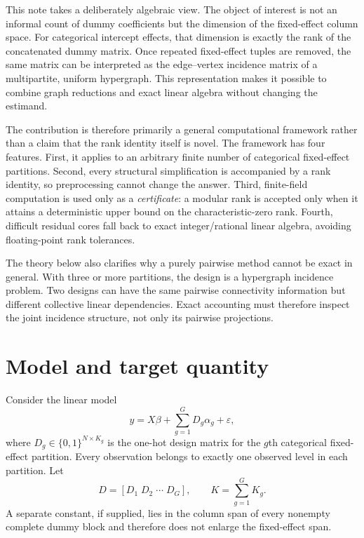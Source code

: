 \documentclass[11pt]{article}
\theoremstyle{definition}
\newcommand{\1}{\mathbf{1}}
\begin{document}
This note takes a deliberately algebraic view. The object of interest is not an informal count of dummy coefficients but the dimension of the fixed-effect column space. For categorical intercept effects, that dimension is exactly the rank of the concatenated dummy matrix. Once repeated fixed-effect tuples are removed, the same matrix can be interpreted as the edge--vertex incidence matrix of a multipartite, uniform hypergraph. This representation makes it possible to combine graph reductions and exact linear algebra without changing the estimand.

The contribution is therefore primarily a general computational framework rather than a claim that the rank identity itself is novel. The framework has four features. First, it applies to an arbitrary finite number of categorical fixed-effect partitions. Second, every structural simplification is accompanied by a rank identity, so preprocessing cannot change the answer. Third, finite-field computation is used only as a \emph{certificate}: a modular rank is accepted only when it attains a deterministic upper bound on the characteristic-zero rank. Fourth, difficult residual cores fall back to exact integer/rational linear algebra, avoiding floating-point rank tolerances.

The theory below also clarifies why a purely pairwise method cannot be exact in general. With three or more partitions, the design is a hypergraph incidence problem. Two designs can have the same pairwise connectivity information but different collective linear dependencies. Exact accounting must therefore inspect the joint incidence structure, not only its pairwise projections.

\section{Model and target quantity}

Consider the linear model
\begin{equation}
  y = X\beta + \sum_{g=1}^{G} D_g\alpha_g + \varepsilon,
  \label{eq:model}
\end{equation}
where $D_g\in\{0,1\}^{N\times K_g}$ is the one-hot design matrix for the $g$th categorical fixed-effect partition. Every observation belongs to exactly one observed level in each partition. Let
\begin{equation}
  D = [D_1\;D_2\;\cdots\;D_G], \qquad K=\sum_{g=1}^{G}K_g.
\end{equation}
A separate constant, if supplied, lies in the column span of every nonempty complete dummy block and therefore does not enlarge the fixed-effect span.
\end{document}
